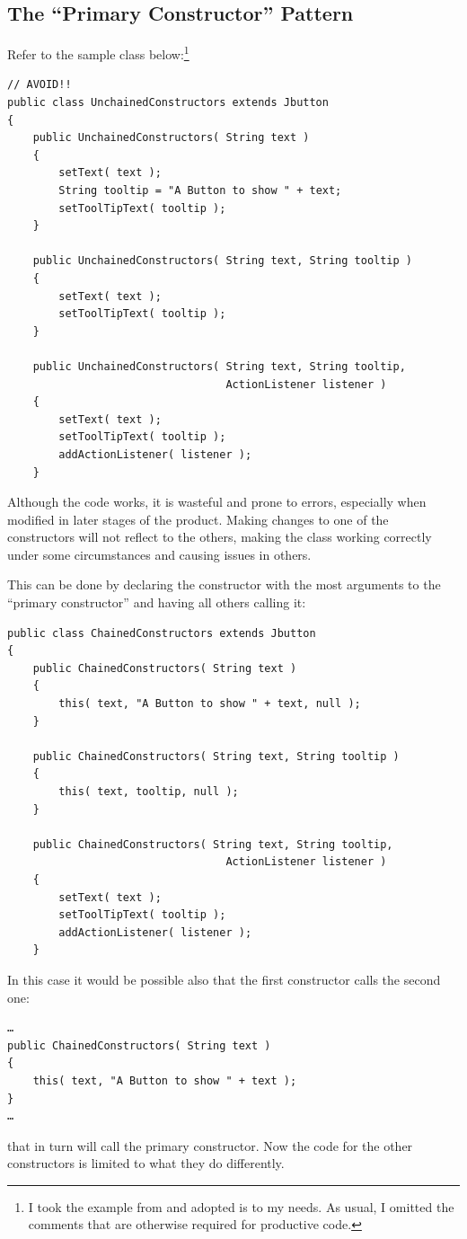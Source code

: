 
\subsection{The “Primary Constructor” Pattern}
Refer to the sample class below:\footnote{I took the example from \autocite{Simmons:HARDCORE_JAVA} and adopted is to my needs. As usual, I omitted the comments that are otherwise required for productive code.}
\begin{lstlisting}
// AVOID!!
public class UnchainedConstructors extends Jbutton
{
    public UnchainedConstructors( String text )
    {
        setText( text );
        String tooltip = "A Button to show " + text;
        setToolTipText( tooltip );
    }
    
    public UnchainedConstructors( String text, String tooltip )
    {
        setText( text );
        setToolTipText( tooltip );
    }
    
    public UnchainedConstructors( String text, String tooltip,
                                  ActionListener listener )
    {
        setText( text );
        setToolTipText( tooltip );
        addActionListener( listener );
    }
\end{lstlisting}

Although the code works, it is wasteful and prone to errors, especially when modified in later stages of the product. Making changes to one of the constructors will not reflect to the others, making the class working correctly under some circumstances and causing issues in others.

This can be done by declaring the constructor with the most arguments to the “primary constructor” and having all others calling it:
\begin{lstlisting}
public class ChainedConstructors extends Jbutton
{
    public ChainedConstructors( String text )
    {
        this( text, "A Button to show " + text, null );
    }
    
    public ChainedConstructors( String text, String tooltip )
    {
        this( text, tooltip, null );
    }
    
    public ChainedConstructors( String text, String tooltip,
                                  ActionListener listener )
    {
        setText( text );
        setToolTipText( tooltip );
        addActionListener( listener );
    }
\end{lstlisting}
In this case it would be possible also that the first constructor calls the second one:
\begin{lstlisting}
…
public ChainedConstructors( String text )
{
    this( text, "A Button to show " + text );
}
…
\end{lstlisting}
that in turn will call the primary constructor. Now the code for the other constructors is limited to what they do differently.

